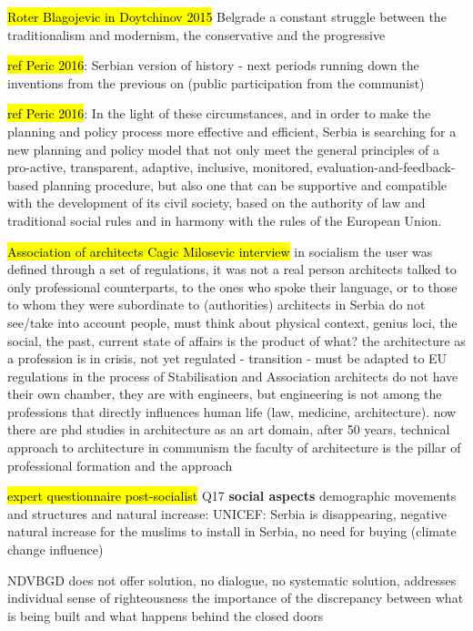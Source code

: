 \documentclass[11pt]{report}
\begin{document}
\hl{Roter Blagojevic in Doytchinov 2015}
Belgrade a constant struggle between the traditionalism and modernism, the conservative and the progressive

\hl{ref Peric 2016}:
Serbian version of history - next periods running down the inventions from the previous on (public participation from the communist)
 
\hl{ref Peric 2016}:
In the light of these circumstances, and in order to make the planning and policy process more effective and efficient, Serbia is searching for a new planning and policy model that not only meet the general principles of a pro-active, transparent, adaptive, inclusive, monitored, evaluation-and-feedback-based planning procedure, but also one that can be supportive and compatible with the development of its civil society, based on the authority of law and traditional social rules and in harmony with the rules of the European Union.
    
\hl{Association of architects Cagic Milosevic interview}
in socialism the user was defined through a set of regulations, it was not a real person
architects talked to only professional counterparts, to the ones who spoke their language, or to those to whom they were subordinate to (authorities)
architects in Serbia do not see/take into account people, must think about physical context, genius loci, the social, the past, current state of affairs is the product of what?
the architecture as a profession is in crisis, not yet regulated - transition - must be adapted to EU regulations in the process of Stabilisation and Association
architects do not have their own chamber, they are with engineers, but engineering is not among the professions that directly influences human life (law, medicine, architecture).
now there are phd studies in architecture as an art domain, after 50 years, technical approach to architecture in communism
the faculty of architecture is the pillar of professional formation and the approach

\hl{expert questionnaire post-socialist}
Q17
\textbf{social aspects}
demographic movements and structures
and natural increase:
UNICEF: Serbia is disappearing, negative natural increase
for the muslims to install in Serbia, no need for buying (climate change influence)

NDVBGD does not offer solution, no dialogue, no systematic solution, addresses individual sense of righteousness
the importance of the discrepancy between what is being built and what happens behind the closed doors
\end{document}
